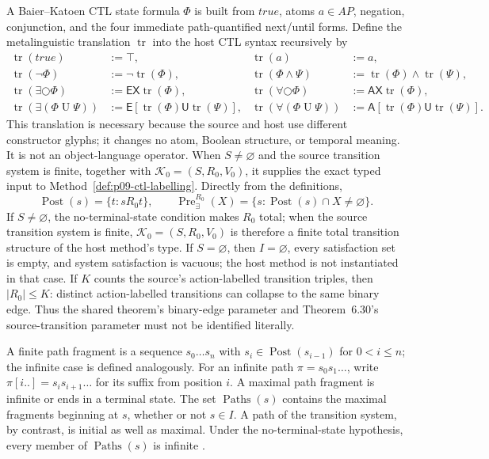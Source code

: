 A Baier--Katoen CTL state formula \(\Phi\) is built from \(true\), atoms
\(a\in AP\), negation, conjunction, and the four immediate path-quantified
next/until forms.  Define the metalinguistic translation \(\operatorname{tr}\)
into the
host CTL syntax recursively by
\[
\begin{aligned}
 \operatorname{tr}(true)&:=\top,&
 \operatorname{tr}(a)&:=a,\\
 \operatorname{tr}(\neg\Phi)&:=\neg\operatorname{tr}(\Phi),&
 \operatorname{tr}(\Phi\land\Psi)
   &:=\operatorname{tr}(\Phi)\land\operatorname{tr}(\Psi),\\
 \operatorname{tr}(\exists\bigcirc\Phi)
   &:=\mathsf{EX}\operatorname{tr}(\Phi),&
 \operatorname{tr}(\forall\bigcirc\Phi)
   &:=\mathsf{AX}\operatorname{tr}(\Phi),\\
 \operatorname{tr}(\exists(\Phi\mathbin{U}\Psi))
   &:=\mathsf E[\operatorname{tr}(\Phi)\mathbin{\mathsf U}
                   \operatorname{tr}(\Psi)],&
 \operatorname{tr}(\forall(\Phi\mathbin{U}\Psi))
   &:=\mathsf A[\operatorname{tr}(\Phi)\mathbin{\mathsf U}
                   \operatorname{tr}(\Psi)].
\end{aligned}
\]
This translation is necessary because the source and host use different
constructor glyphs; it changes no atom, Boolean structure, or temporal
meaning.  It is not an object-language operator.  When \(S\ne\varnothing\)
and the source transition system is finite, together with
\(\mathcal K_0=(S,R_0,V_0)\), it supplies the exact typed input to
Method~\ref{def:p09-ctl-labelling}.
Directly from the definitions,
\[
 \operatorname{Post}(s)=\{t:sR_0t\},
 \qquad
 \operatorname{Pre}^{R_0}_{\exists}(X)
   =\{s:\operatorname{Post}(s)\cap X\ne\varnothing\}.
\]
If \(S\ne\varnothing\), the no-terminal-state condition makes \(R_0\) total;
when the source transition system is finite,
\(\mathcal K_0=(S,R_0,V_0)\) is therefore a finite total transition structure
of the host method's type.  If \(S=\varnothing\), then \(I=\varnothing\), every
satisfaction set is empty, and system satisfaction is vacuous; the host method
is not instantiated in that case.
If \(K\) counts the source's action-labelled transition triples, then
\(\lvert R_0\rvert\le K\): distinct action-labelled transitions can collapse
to the same binary edge.  Thus the shared theorem's binary-edge parameter and
Theorem~6.30's source-transition parameter must not be identified literally.

A finite path fragment is a sequence \(s_0\ldots s_n\) with
\(s_i\in\operatorname{Post}(s_{i-1})\) for \(0<i\le n\); the infinite case
is defined analogously.  For an infinite path
\(\pi=s_0s_1\ldots\), write
\(\pi[i..]=s_is_{i+1}\ldots\) for its suffix from position \(i\).  A maximal
path fragment is infinite or ends in a terminal state.  The set
\(\operatorname{Paths}(s)\) contains the maximal
fragments beginning at \(s\), whether or not \(s\in I\).  A path of the
transition system, by contrast, is initial as well as maximal.  Under the
no-terminal-state hypothesis, every member of \(\operatorname{Paths}(s)\) is
infinite \cite[defs.~2.1, 2.3--2.4 and 3.4--3.6; pp.~20, 23,
95--96]{BaierKatoen2008}.

